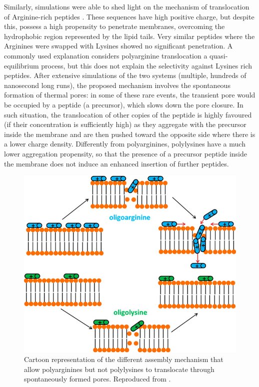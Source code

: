 Similarly, simulations were able to shed light on the mechanism of translocation of Arginine-rich peptides%
\citep{Sun2015}. These sequences have high positive charge, but despite this, possess a high propensity to penetrate membranes, overcoming the hydrophobic region represented by the lipid tails. Very similar peptides where the Arginines were swapped with Lysines showed no significant penetration.
%
A commonly used explanation considers polyarginine translocation a quasi-equilibrium process, but this does not explain the selectivity against Lysines rich peptides.
%
After extensive simulations of the two systems (multiple, hundreds of nanosecond long runs), the proposed mechanism involves the spontaneous formation of thermal pores: in some of these rare events, the transient pore would be occupied by a peptide (a precursor), which slows down the pore closure. In such situation, the translocation of other copies of the peptide is highly favoured (if their concentration is sufficiently high) as they aggregate with the precursor inside the membrane and are then pushed toward the opposite side where there is a lower charge density.
%
Differently from polyarginines, polylysines have a much lower aggregation propensity, so that the presence of a precursor peptide inside the membrane does not induce an enhanced insertion of further peptides.
%
\begin{figure}[t!]
\centering
\includegraphics[width=0.65\linewidth]{2methods/pics/polyarg.jpeg}
%
\caption[Polyarginine translocation]{Cartoon representation of the different assembly mechanism that allow polyarginines but not polylysines to translocate through spontaneously formed pores. Reproduced from \citet{Sun2015}.}
\label{fig:polyArg}
\end{figure}

